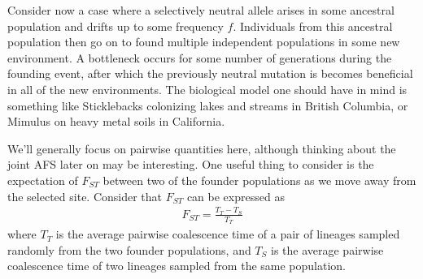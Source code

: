 \documentclass[reqno]{amsart}
\begin{document}
Consider now a case where a selectively neutral allele arises in some ancestral population and drifts up to some frequency $f$. Individuals from this ancestral population then go on to found multiple independent populations in some new environment. A bottleneck occurs for some number of generations during the founding event, after which the previously neutral mutation is becomes beneficial in all of the new environments. The biological model one should have in mind is something like Sticklebacks colonizing lakes and streams in British Columbia, or Mimulus on heavy metal soils in California.

We'll generally focus on pairwise quantities here, although thinking about the joint AFS later on may be interesting. One useful thing to consider is the expectation of $F_{ST}$ between two of the founder populations as we move away from the selected site. Consider that $F_{ST}$ can be expressed as
\begin{align}
	F_{ST} = \frac{T_T - T_S}{T_T}
\end{align}
where $T_T$ is the average pairwise coalescence time of a pair of lineages sampled randomly from the two founder populations, and $T_S$ is the average pairwise coalescence time of two lineages sampled from the same population.
\end{document}

